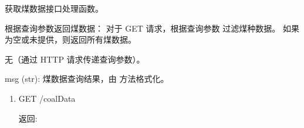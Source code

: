 \documentclass[a4paper,12pt,english]{sphinxmanual}
\begin{document}

\begin{fulllineitems}
\label{\detokenize{api/login:login.getData}}
\pysigstartsignatures
{}
\pysigstopsignatures
\sphinxAtStartPar
获取煤数据接口处理函数。

\sphinxAtStartPar
根据查询参数返回煤数据：
\sphinxhyphen{} 对于 GET 请求，根据查询参数  过滤煤种数据。
\sphinxhyphen{} 如果  为空或未提供，则返回所有煤数据。
\begin{description}
\sphinxAtStartPar
无（通过 HTTP 请求传递查询参数）。

\begin{description}
\sphinxAtStartPar
msg (str): 煤数据查询结果，由  方法格式化。

\end{description}

\begin{enumerate}
%
\item {} \begin{description}
\begin{description}
\sphinxlineitem{::}
\sphinxAtStartPar
GET /coalData

\end{description}

\sphinxAtStartPar
返回:

\begin{sphinxVerbatim}[commandchars=\\\{\}]
     \PYG{p}{[}
             
             
    \PYG{p}{]}
\end{sphinxVerbatim}


\end{description}
\end{enumerate}
\end{description}
\end{fulllineitems}
\end{document}
